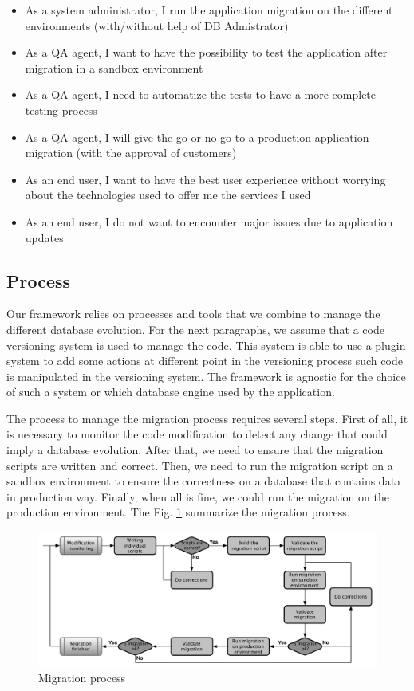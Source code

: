\begin{itemize}
\item As a system administrator, I run the application migration on the different environments (with/without help of DB Admistrator)
\item As a QA agent, I want to have the possibility to test the application after migration in a sandbox environment
\item As a QA agent, I need to automatize the tests to have a more complete testing process
\item As a QA agent, I will give the go or no go to a production application migration (with the approval of customers)
\item As an end user, I want to have the best user experience without worrying about the technologies used to offer me the services I used
\item As an end user, I do not want to encounter major issues due to application updates
\end{itemize}

\subsection{Process}
	\label{sec:def:process}

Our framework relies on processes and tools that we combine to manage the different database evolution. For the next paragraphs, we assume that a code versioning system is used to manage the code. This system is able to use a plugin system to add some actions at different point in the versioning process such code is manipulated in the versioning system. The framework is agnostic for the choice of such a system or which database engine used by the application.

The process to manage the migration process requires several steps. First of all, it is necessary to monitor the code modification to detect any change that could imply a database evolution. After that, we need to ensure that the migration scripts are written and correct. Then, we need to run the migration script on a sandbox environment to ensure the correctness on a database that contains data in production way. Finally, when all is fine, we could run the migration on the production environment. The Fig. \ref{fig:migrationProcess} summarize the migration process.

\begin{figure}[h]
        \centering
        \includegraphics[scale=0.50]{images/MigrationProcess.pdf}
        \caption{Migration process}
        \label{fig:migrationProcess}
\end{figure}


